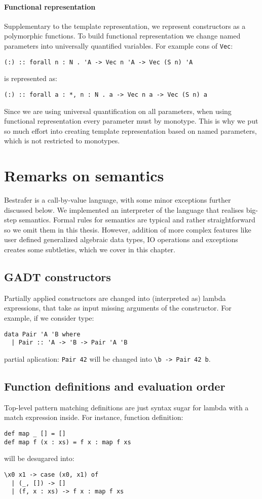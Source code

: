 \documentclass[declaration,shortabstract,english]{iithesis}
\begin{document}
\subsubsection*{Functional representation}
Supplementary to the template representation, we represent constructors as a polymorphic functions.
To build functional representation we change named parameters into universally quantified variables.
For example cons of \verb+Vec+:
\begin{verbatim}
(:) :: forall n : N . 'A -> Vec n 'A -> Vec (S n) 'A
\end{verbatim}
is represented as:
\begin{verbatim}
(:) :: forall a : *, n : N . a -> Vec n a -> Vec (S n) a
\end{verbatim}
Since we are using universal quantification on all parameters,
when using functional representation every parameter must by monotype.
This is why we put so much effort into creating template representation based on named
parameters, which is not restricted to monotypes.

\chapter{Remarks on semantics}
Bestrafer is a call-by-value language, with some minor exceptions further discussed below.
We implemented an interpreter of the language that realises big-step semantics.
Formal rules for semantics are typical and rather straightforward so we omit them in this thesis. However, addition
of more complex features like user defined generalized algebraic data types, IO operations and exceptions creates
some subtleties, which we cover in this chapter.
\section{GADT constructors}
Partially applied constructors are changed into (interpreted as) lambda expressions, that take as input missing arguments of the constructor.
For example, if we consider type:
\begin{verbatim}
data Pair 'A 'B where
  | Pair :: 'A -> 'B -> Pair 'A 'B
\end{verbatim}
partial aplication: \verb+Pair 42+ will be changed into \verb+\b -> Pair 42 b+.
\section{Function definitions and evaluation order}
Top-level pattern matching definitions are just syntax sugar for lambda with a match expression inside.
For instance, function definition:
\begin{verbatim}
def map _ [] = []
def map f (x : xs) = f x : map f xs
\end{verbatim}
will be desugared into:
\begin{verbatim}
\x0 x1 -> case (x0, x1) of
  | (_, []) -> []
  | (f, x : xs) -> f x : map f xs
\end{verbatim}
\end{document}
